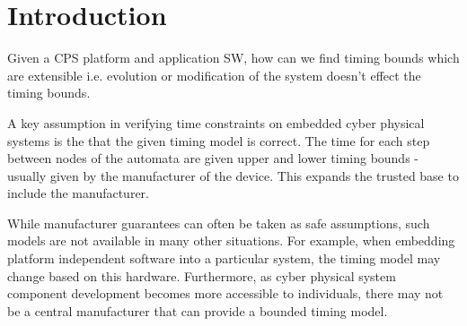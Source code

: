 \section{Introduction}


Given a CPS platform and application SW, how can we find timing bounds which are extensible i.e. evolution or modification of the system doesn't effect the timing bounds. 

A key assumption in verifying time constraints on  embedded cyber physical systems is the that the given timing model is correct.
The time for each step between nodes of the automata are given upper and lower timing bounds - usually given by the manufacturer of the device.
This expands the trusted base to include the manufacturer.

While manufacturer guarantees can often be taken as safe assumptions, such models are not available in many other situations.
For example, when embedding platform independent software into a particular system, the timing model may change based on this hardware.
Furthermore, as cyber physical system component development becomes more accessible to individuals, there may not be a central manufacturer that can provide a bounded timing model.

